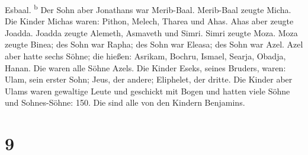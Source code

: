 Esbaal. \textsuperscript{b}  Der Sohn aber Jonathans war
Merib-Baal. Merib-Baal zeugte Micha.  Die Kinder Michas
waren: Pithon, Melech, Tharea und Ahas.  Ahas aber zeugte
Joadda. Joadda zeugte Alemeth, Asmaveth und Simri. Simri zeugte Moza.
 Moza zeugte Binea; des Sohn war Rapha; des Sohn war
Eleasa; des Sohn war Azel.  Azel aber hatte sechs Söhne;
die hießen: Asrikam, Bochru, Ismael, Searja, Obadja, Hanan. Die waren
alle Söhne Azels.  Die Kinder Eseks, seines Bruders,
waren: Ulam, sein erster Sohn; Jeus, der andere; Eliphelet, der dritte.
 Die Kinder aber Ulams waren gewaltige Leute und
geschickt mit Bogen und hatten viele Söhne und Sohnes-Söhne: 150. Die
sind alle von den Kindern Benjamins.

\hypertarget{section-8}{%
\section{9}\label{section-8}}

